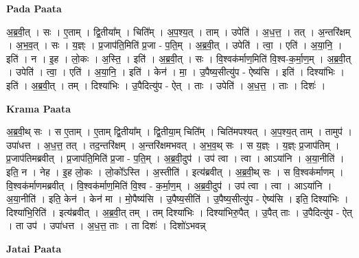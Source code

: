 \documentclass[17pt]{extarticle}
\begin{document}
\textbf{Pada Paata} \newline

अ॒ब्र॒वी॒त् । सः । ए॒ताम् । द्वि॒तीया᳚म् । चिति᳚म् । अ॒प॒श्य॒त् । ताम् । उपेति॑ । अ॒ध॒त्त॒ । तत् । अ॒न्तरि॑क्षम् । अ॒भ॒व॒त् । सः । य॒ज्ञ्ः । प्र॒जाप॑ति॒मिति॑ प्र॒जा - प॒ति॒म् । अ॒ब्र॒वी॒त् । उपेति॑ । त्वा॒ । एति॑ । अ॒या॒नि॒ । इति॑ । न । इ॒ह । लो॒कः । अ॒स्ति॒ । इति॑ । अ॒ब्र॒वी॒त् । सः । वि॒श्वक॑र्माण॒मिति॑ वि॒श्व-क॒र्मा॒ण॒म् । अ॒ब्र॒वी॒त् । उपेति॑ । त्वा॒ । एति॑ । अ॒या॒नि॒ । इति॑ । केन॑ । मा॒ । उ॒पैष्य॒सीत्यु॑प - ऐष्य॑सि । इति॑ । दिश्या॑भिः । इति॑ । अ॒ब्र॒वी॒त् । तम् । दिश्या॑भिः । उ॒पैदित्यु॑प - ऐत् । ताः । उपेति॑ । अ॒ध॒त्त॒ । ताः । दिशः॑ ।  \newline


\textbf{Krama Paata} \newline

अ॒ब्र॒वी॒थ् सः । स ए॒ताम् । ए॒ताम् द्वि॒तीया᳚म् । द्वि॒तीया॒म् चिति᳚म् । चिति॑मपश्यत् । अ॒प॒श्य॒त् ताम् । तामुप॑ । उपा॑धत्त । अ॒ध॒त्त॒ तत् । तद॒न्तरि॑क्षम् । अ॒न्तरि॑क्षमभवत् । अ॒भ॒व॒थ् सः । स य॒ज्ञ्ः । य॒ज्ञ्ः प्र॒जाप॑तिम् । प्र॒जाप॑तिमब्रवीत् । प्र॒जाप॑ति॒मिति॑ प्र॒जा - प॒ति॒म् । अ॒ब्र॒वी॒दुप॑ । उप॑ त्वा । त्वा । आऽया॑नि । अ॒या॒नीति॑ । इति॒ न । नेह । इ॒ह लो॒कः । लो॒को᳚ऽस्ति । अ॒स्तीति॑ । इत्य॑ब्रवीत् । अ॒ब्र॒वी॒थ् सः । स वि॒श्वक॑र्माणम् । वि॒श्वक॑र्माणमब्रवीत् । वि॒श्वक॑र्माण॒मिति॑ वि॒श्व - क॒र्मा॒ण॒म् । अ॒ब्र॒वी॒दुप॑ । उप॑ त्वा । त्वा । आऽया॑नि । अ॒या॒नीति॑ । इति॒ केन॑ । केन॑ मा । मो॒पैष्य॑सि । उ॒पैष्य॒सीति॑ । उ॒पैष्य॒सीत्यु॑प - ऐष्य॑सि । इति॒ दिश्या॑भिः । दिश्या॑भि॒रिति॑ । इत्य॑ब्रवीत् । अ॒ब्र॒वी॒त् तम् । तम् दिश्या॑भिः । दिश्या॑भिरु॒पैत् । उ॒पैत् ताः । उ॒पैदित्यु॑प - ऐत् । ता उप॑ । उपा॑धत्त । अ॒ध॒त्त॒ ताः । ता दिशः॑ । दिशो॑ऽभवन्न् \newline

\textbf{Jatai Paata} \newline
\end{document}
